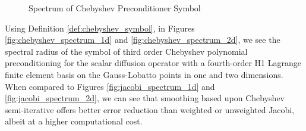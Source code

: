 \begin{figure}[!ht]
  \centering
  \hfill
  \caption{Spectrum of Chebyshev Preconditioner Symbol}
\end{figure}

Using Definition \ref{def:chebyshev_symbol}, in Figures \ref{fig:chebyshev_spectrum_1d} and \ref{fig:chebyshev_spectrum_2d}, we see the spectral radius of the symbol of third order Chebyshev polynomial preconditioning for the scalar diffusion operator with a fourth-order H1 Lagrange finite element basis on the Gauss-Lobatto points in one and two dimensions.
When compared to Figures \ref{fig:jacobi_spectrum_1d} and \ref{fig:jacobi_spectrum_2d}, we can see that smoothing based upon Chebyshev semi-iterative offers better error reduction than weighted or unweighted Jacobi, albeit at a higher computational cost.
